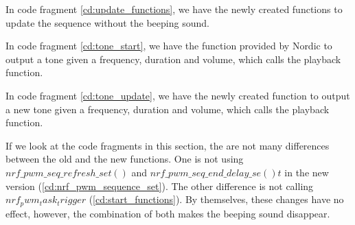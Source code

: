 In code fragment \ref{cd:update_functions}, we have the newly created functions to update the sequence without the beeping sound.

\makebox[\linewidth][c]{$\smash{\vdots}$}


\makebox[\linewidth][c]{$\smash{\vdots}$}

\makebox[\linewidth][c]{$\smash{\vdots}$}


In code fragment \ref{cd:tone_start}, we have the function provided by Nordic to output a tone given a frequency, duration and volume, which calls the playback function.

\makebox[\linewidth][c]{$\smash{\vdots}$}

\makebox[\linewidth][c]{$\smash{\vdots}$}


In code fragment \ref{cd:tone_update}, we have the newly created function to output a new tone given a frequency, duration and volume, which calls the playback function.

\makebox[\linewidth][c]{$\smash{\vdots}$}

\makebox[\linewidth][c]{$\smash{\vdots}$}


If we look at the code fragments in this section, the are not many differences between the old and the new functions. One is not using $nrf\_pwm\_seq\_refresh\_set()$ and $nrf\_pwm\_seq\_end\_delay\_se()t$ in the new version (\ref{cd:nrf_pwm_sequence_set}). The other difference is not calling $nrf_pwm_task_trigger$ (\ref{cd:start_functions}). By themselves, these changes have no effect, however, the combination of both makes the beeping sound disappear.

